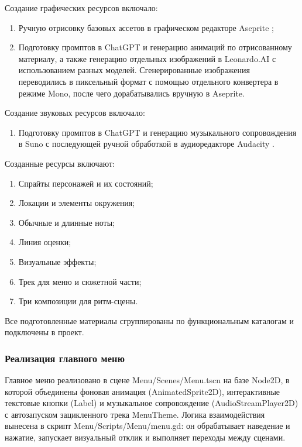 \documentclass[utf8, russian]{eskdtext}
\numberwithin{equation}{section}
\begin{document}
Создание графических ресурсов включало:
\begin{enumerate}
    \item Ручную отрисовку базовых ассетов в графическом редакторе Aseprite \cite{aseprite};
    \item Подготовку промптов в ChatGPT \cite{chatgpt} и генерацию анимаций по отрисованному материалу, а также генерацию отдельных изображений в Leonardo.AI \cite{leonardo} с использованием разных моделей. Сгенерированные изображения переводились в пиксельный формат с помощью отдельного конвертера в режиме Mono, после чего дорабатывались вручную в Aseprite.
\end{enumerate}

Создание звуковых ресурсов включало:
\begin{enumerate}
    \item Подготовку промптов в ChatGPT \cite{chatgpt} и генерацию музыкального сопровождения в Suno \cite{suno} с последующей ручной обработкой в аудиоредакторе Audacity \cite{audacity}.
\end{enumerate}

Созданные ресурсы включают:
\begin{enumerate}
    \item Спрайты персонажей и их состояний;
    \item Локации и элементы окружения;
    \item Обычные и длинные ноты;
    \item Линия оценки;
    \item Визуальные эффекты;
    \item Трек для меню и сюжетной части;
    \item Три композиции для ритм-сцены.
\end{enumerate}

Все подготовленные материалы сгруппированы по функциональным каталогам и подключены в проект.

\subsubsection{Реализация главного меню}

Главное меню реализовано в сцене Menu/Scenes/Menu.tscn на базе Node2D, в которой объединены фоновая анимация (AnimatedSprite2D), интерактивные текстовые кнопки (Label) и музыкальное сопровождение (AudioStreamPlayer2D) с автозапуском зацикленного трека MenuTheme. Логика взаимодействия вынесена в скрипт Menu/Scripts/Menu/menu.gd: он обрабатывает наведение и нажатие, запускает визуальный отклик и выполняет переходы между сценами.
\end{document}
